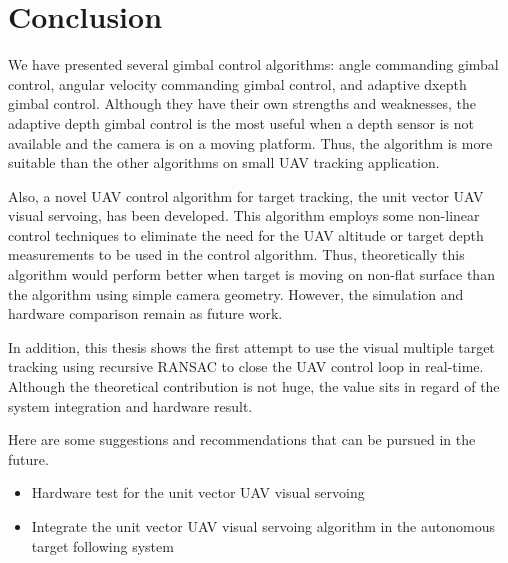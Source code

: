 \chapter{Conclusion}
\label{chapter5}
We have presented several gimbal control algorithms: angle commanding gimbal control, angular velocity commanding gimbal control, and adaptive dxepth gimbal control. Although they have their own strengths and weaknesses, the adaptive depth gimbal control is the most useful when a depth sensor is not available and the camera is on a moving platform. Thus, the algorithm is more suitable than the other algorithms on small UAV tracking application.

Also, a novel UAV control algorithm for target tracking, the unit vector UAV visual servoing, has been developed. This algorithm employs some non-linear control techniques to eliminate the need for the UAV altitude or target depth measurements to be used in the control algorithm. Thus, theoretically this algorithm would perform better when target is moving on non-flat surface than the algorithm using simple camera geometry. However, the simulation and hardware comparison remain as future work.

In addition, this thesis shows the first attempt to use the visual multiple target tracking using recursive RANSAC to close the UAV control loop in real-time. Although the theoretical contribution is not huge, the value sits in regard of the system integration and hardware result.

Here are some suggestions and recommendations that can be pursued in the future.
\begin{itemize}
	\item Hardware test for the unit vector UAV visual servoing
	\item Integrate the unit vector UAV visual servoing algorithm in the autonomous target following system
\end{itemize}
